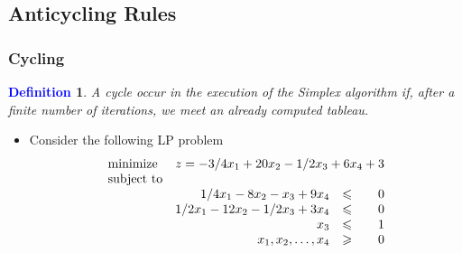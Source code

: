 \documentclass{beamer}
\theoremstyle{plain}
\newcommand{\git}[1]{\textcolor{grena}{\it #1}}
\newtheorem{deff}{\bf \textcolor{blue}{Definition}}[subsection]
\let\le\leqslant
\let\ge\geqslant
\begin{document}
\subsection{Anticycling Rules}
\begin{frame}\frametitle{Cycling}
\justifying

\begin{mdframed}[style=myf]
\begin{deff}
\justifying
A \git{cycle} occur in the execution of the Simplex algorithm if, after a finite number of iterations, we meet an already computed tableau.
\end{deff}
\end{mdframed}

\begin{itemize}
\justifying

\item Consider the following LP problem
\[ \begin{array}{lrcr}
\textrm{minimize} & \multicolumn{3}{c}{z = -3/4x_1 + 20x_2 - 1/2x_3 + 6 x_4 + 3}  \\
\textrm{subject to} & \\
&1/4x_1 - 8x_2 - x_3 + 9x_4 & \le & 0\\
& 1/2x_1 - 12x_2 - 1/2x_3 + 3x_4  & \le & 0 \\
& x_3  & \le & 1\\
& x_1, x_2, \ldots, x_4 & \ge & 0
\end{array}
\]

\end{itemize}

\end{frame}
\end{document}
